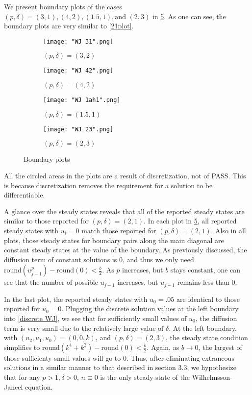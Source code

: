 \documentclass[11pt]{article}
\begin{document}
We present boundary plots of the cases $(p, \delta) = (3,1), (4, 2), (1.5, 1), \text{and } (2,3)$ in \cref{large_positive_plot}. As one can see, the boundary plots are very similar to \cref{21plot}.

\begin{figure}[h]
\begin{subfigure}{.25\textwidth}
  \centering
  \texttt{[image: "WJ 31".png]}
  \caption{$(p, \delta) = (3,2)$}
  \label{31plot}
\end{subfigure}%
\begin{subfigure}{.25\textwidth}
  \centering
  \texttt{[image: "WJ 42".png]}
  \caption{$(p, \delta) = (4,2)$}
  \label{42plot}
\end{subfigure}%
\begin{subfigure}{.25\textwidth}
  \centering
  \texttt{[image: "WJ 1ah1".png]}
  \caption{$(p, \delta) = (1.5,1)$}
  \label{1ah1plot}
\end{subfigure}%
\begin{subfigure}{.25\textwidth}
  \centering
  \texttt{[image: "WJ 23".png]}
  \caption{$(p, \delta) = (2,3)$}
  \label{23plot}
\end{subfigure}
\caption{Boundary plots}
\label{large_positive_plot}
\end{figure}

All the circled areas in the plots are a result of discretization, not of PASS. This is because discretization removes the requirement for a solution to be differentiable. 

A glance over the steady states reveals that all of the reported steady states are similar to those reported for $(p, \delta) = (2,1)$. In each plot in \cref{large_positive_plot}, all reported steady states with $u_i = 0$ match those reported for $(p, \delta) = (2,1)$. Also in all plots, those steady states for boundary pairs along the main diagonal are constant steady states at the value of the boundary. As previously discussed, the diffusion term of constant solutions is 0, and thus we only need $\text{round}(u_{j-1}^p) - \text{round}(0) < \frac{b}{2}$. As $p$ increases, but $b$ stays constant, one can see that the number of possible $u_{j-1}$ increases, but $u_{j-1}$ remains less than 0. 

In the last plot, the reported steady states with $u_0 = .05$ are identical to those reported for $u_0 = 0$. Plugging the discrete solution values at the left boundary into \cref{discrete WJ}, we see that for sufficiently small values of $u_0$, the diffusion term is very small due to the relatively large value of $\delta$. At the left boundary, with $(u_2, u_1, u_0) = (0,0,k)$, and $(p, \delta) = (2,3)$, the steady state condition simplifies to $\text{round}(k^4 + k^2) - \text{round}(0) < \frac{b}{2}$. Again, as $b \rightarrow 0$, the largest of those sufficienty small values will go to 0. Thus, after eliminating extraneous solutions in a similar manner to that described in section 3.3, we hypothesize that for any $p > 1, \delta > 0$, $n \equiv 0$ is the only steady state of the Wilhelmsson-Jancel equation.
\end{document}
